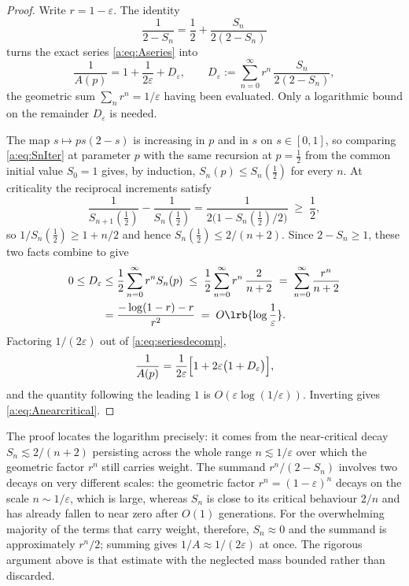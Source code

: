 \begin{proof}
Write $r = 1-\varepsilon$. The identity
\begin{equation}
\label{a:eq:denomsplit}
\frac{1}{2-S_n} = \frac12 + \frac{S_n}{2(2-S_n)}
\end{equation}
turns the exact series \cref{a:eq:Aseries} into
\begin{equation}
\label{a:eq:seriesdecomp}
\frac{1}{A(p)} = 1 + \frac{1}{2\varepsilon} + D_\varepsilon,
\qquad
D_\varepsilon := \sum_{n=0}^{\infty}r^n\,\frac{S_n}{2(2-S_n)} ,
\end{equation}
the geometric sum $\sum_nr^n = 1/\varepsilon$ having been evaluated. Only a
logarithmic bound on the remainder $D_\varepsilon$ is needed.

The map $s\mapsto ps(2-s)$ is increasing in $p$ and in $s$ on $s\in[0,1]$, so
comparing \cref{a:eq:SnIter} at parameter $p$ with the same recursion at $p=\tfrac12$
from the common initial value $S_0=1$ gives, by induction,
$S_n(p)\le S_n(\tfrac12)$ for every $n$. At criticality the reciprocal increments
satisfy
\begin{equation}
\label{a:eq:recipincrement}
\frac{1}{S_{n+1}(\tfrac12)}-\frac{1}{S_n(\tfrac12)}
= \frac{1}{2\bigl(1-S_n(\tfrac12)/2\bigr)}\;\ge\;\frac12 ,
\end{equation}
so $1/S_n(\tfrac12)\ge1+n/2$ and hence $S_n(\tfrac12)\le2/(n+2)$. Since
$2-S_n\ge1$, these two facts combine to give
\begin{align}
0\le D_\varepsilon
&\le \frac12\sum_{n=0}^{\infty}r^nS_n(p)
 \;\le\; \frac12\sum_{n=0}^{\infty}r^n\,\frac{2}{n+2}
 \;=\; \sum_{n=0}^{\infty}\frac{r^n}{n+2}
\notag\\
&= \frac{-\log(1-r)-r}{r^2}
 \;=\; O\lrb{\log\frac1\varepsilon} .
\label{a:eq:Dbound}
\end{align}
Factoring $1/(2\varepsilon)$ out of \cref{a:eq:seriesdecomp},
\begin{equation*}
\frac{1}{A(p)} = \frac{1}{2\varepsilon}
\Bigl[1 + 2\varepsilon\bigl(1+D_\varepsilon\bigr)\Bigr],
\end{equation*}
and the quantity following the leading $1$ is $O(\varepsilon\log(1/\varepsilon))$.
Inverting gives \cref{a:eq:Anearcritical}.
\end{proof}

The proof locates the logarithm precisely: it comes from the near-critical decay
$S_n\lesssim2/(n+2)$ persisting across the whole range $n\lesssim1/\varepsilon$ over
which the geometric factor $r^n$ still carries weight. The
summand $r^n/(2-S_n)$ involves two decays on very different scales: the geometric
factor $r^n = (1-\varepsilon)^n$ decays on the scale $n\sim1/\varepsilon$, which is
large, whereas $S_n$ is close to its critical behaviour $2/n$ and has already
fallen to near zero after $O(1)$ generations. For the overwhelming majority of the
terms that carry weight, therefore, $S_n\approx0$ and the summand is approximately
$r^n/2$; summing gives $1/A\approx1/(2\varepsilon)$ at once. The rigorous argument
above is that estimate with the neglected mass bounded rather than discarded.

